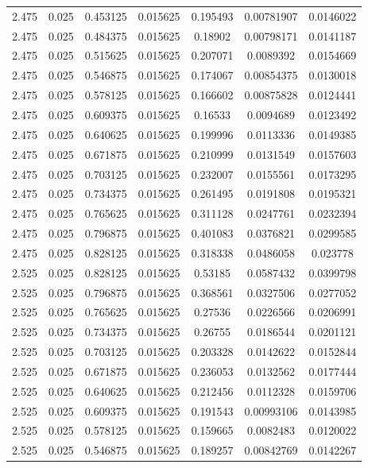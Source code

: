\begin{flushleft}
\begin{longtable}{ccccccc}
2.475 & 0.025 & 0.453125 & 0.015625 & 0.195493 & 0.00781907 & 0.0146022  \\ 
2.475 & 0.025 & 0.484375 & 0.015625 & 0.18902 & 0.00798171 & 0.0141187  \\ 
2.475 & 0.025 & 0.515625 & 0.015625 & 0.207071 & 0.0089392 & 0.0154669  \\ 
2.475 & 0.025 & 0.546875 & 0.015625 & 0.174067 & 0.00854375 & 0.0130018  \\ 
2.475 & 0.025 & 0.578125 & 0.015625 & 0.166602 & 0.00875828 & 0.0124441  \\ 
2.475 & 0.025 & 0.609375 & 0.015625 & 0.16533 & 0.0094689 & 0.0123492  \\ 
2.475 & 0.025 & 0.640625 & 0.015625 & 0.199996 & 0.0113336 & 0.0149385  \\ 
2.475 & 0.025 & 0.671875 & 0.015625 & 0.210999 & 0.0131549 & 0.0157603  \\ 
2.475 & 0.025 & 0.703125 & 0.015625 & 0.232007 & 0.0155561 & 0.0173295  \\ 
2.475 & 0.025 & 0.734375 & 0.015625 & 0.261495 & 0.0191808 & 0.0195321  \\ 
2.475 & 0.025 & 0.765625 & 0.015625 & 0.311128 & 0.0247761 & 0.0232394  \\ 
2.475 & 0.025 & 0.796875 & 0.015625 & 0.401083 & 0.0376821 & 0.0299585  \\ 
2.475 & 0.025 & 0.828125 & 0.015625 & 0.318338 & 0.0486058 & 0.023778  \\ 
2.525 & 0.025 & 0.828125 & 0.015625 & 0.53185 & 0.0587432 & 0.0399798  \\ 
2.525 & 0.025 & 0.796875 & 0.015625 & 0.368561 & 0.0327506 & 0.0277052  \\ 
2.525 & 0.025 & 0.765625 & 0.015625 & 0.27536 & 0.0226566 & 0.0206991  \\ 
2.525 & 0.025 & 0.734375 & 0.015625 & 0.26755 & 0.0186544 & 0.0201121  \\ 
2.525 & 0.025 & 0.703125 & 0.015625 & 0.203328 & 0.0142622 & 0.0152844  \\ 
2.525 & 0.025 & 0.671875 & 0.015625 & 0.236053 & 0.0132562 & 0.0177444  \\ 
2.525 & 0.025 & 0.640625 & 0.015625 & 0.212456 & 0.0112328 & 0.0159706  \\ 
2.525 & 0.025 & 0.609375 & 0.015625 & 0.191543 & 0.00993106 & 0.0143985  \\ 
2.525 & 0.025 & 0.578125 & 0.015625 & 0.159665 & 0.0082483 & 0.0120022  \\ 
2.525 & 0.025 & 0.546875 & 0.015625 & 0.189257 & 0.00842769 & 0.0142267  \\ 

\end{longtable}
\end{flushleft}

